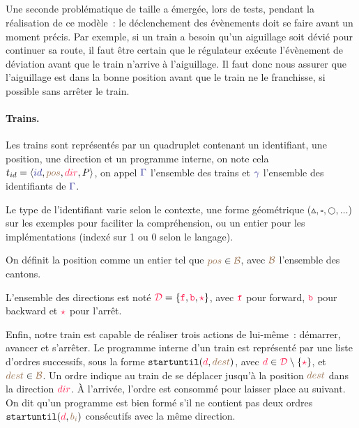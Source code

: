 \documentclass[oneside, a4paper, 11pt]{book}
\newcommand{\trainFmt}[1]{{\color{traincolor} #1}}
\newcommand{\trainTuple}[4]{\langle \trainFmt{#1}, \posFmt{#2}, \dirFmt{#3}, #4 \rangle}
\newcommand{\forward}{\ensuremath{\mathtt{f}}}
\newcommand{\backward}{\ensuremath{\mathtt{b}}}
\newcommand{\directions}{\dirFmt{\mathcal{D}}}
\newcommand{\dirFmt}[1]{{\color{dircolor} #1}}
\newcommand{\dirForward}{\ensuremath{\dirFmt{\forward}}}
\newcommand{\dirBackward}{\ensuremath{\dirFmt{\backward}}}
\newcommand{\dirStop}{\ensuremath{\dirFmt{\star}}}
\newcommand{\posFmt}[1]{{\color{poscolor}{#1}}}
\newcommand{\bid}[1]{\ensuremath{\posFmt{b_{#1}}}}
\newcommand{\su}[2]{{\mbox{$\mathtt{startuntil}(\dirFmt{#1}, \posFmt{#2})$}}}
\begin{document}
\subparagraph{}
Une seconde problématique de taille a émergée, lors de tests, pendant la réalisation de ce modèle~: le déclenchement des évènements doit se faire avant un moment précis.
Par exemple, si un train a besoin qu'un aiguillage soit dévié pour continuer sa route, il faut être certain que le régulateur exécute l'évènement de déviation avant que le train n'arrive à l'aiguillage.
Il faut donc nous assurer que l'aiguillage est dans la bonne position avant que le train ne le franchisse, si possible sans arrêter le train.


\paragraph{Trains.} 
Les trains sont représentés par un quadruplet contenant un identifiant, une position, une direction et un programme interne, on note cela $t_{id} = \trainTuple{id}{pos}{dir}{P}$, on appel $\trainFmt{\Gamma}$ l'ensemble des trains et $\trainFmt{\gamma}$ l'ensemble des identifiants de $\trainFmt{\Gamma}$.

Le type de l'identifiant varie selon le contexte, une forme géométrique ($\vartriangle,\square,\bigcirc,\dots$) sur les exemples pour faciliter la compréhension, ou un entier pour les implémentations (indexé sur 1 ou 0 selon le langage).

On définit la position comme un entier tel que $\posFmt{pos} \in \posFmt{\mathcal{B}}$, avec $\posFmt{\mathcal{B}}$ l'ensemble des cantons. 

L'ensemble des directions est noté $\directions = \{ \dirForward, \dirBackward, \dirStop \}$, avec $\dirForward$ pour forward, $\dirBackward$ pour backward et $\dirStop$ pour l'arrêt.

Enfin, notre train est capable de réaliser trois actions de lui-même~: démarrer, avancer et s'arrêter.
Le programme interne d'un train est représenté par une liste d'ordres successifs, sous la forme \su{d}{dest}, avec $\dirFmt{d} \in \directions \setminus \{\dirStop\}$, et $\posFmt{dest} \in \posFmt{\mathcal{B}}$.
Un ordre indique au train de se déplacer jusqu'à la position $\posFmt{dest}$ dans la direction $\dirFmt{dir}$. À l'arrivée, l'ordre est consommé pour laisser place au suivant.
On dit qu'un programme est bien formé s'il ne contient pas deux ordres \su{d}{\bid{i}} consécutifs avec la même direction.
\end{document}
